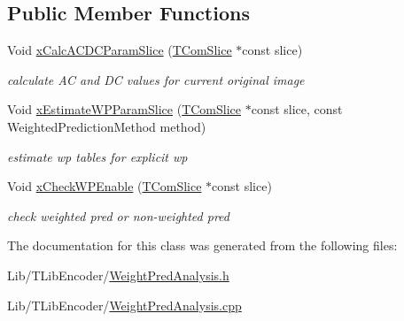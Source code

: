 \subsection*{Public Member Functions}
\begin{DoxyCompactItemize}
\item 
\mbox{\label{class_weight_pred_analysis_a6c76239d875ad77ca7385ce01493a03f}} 
Void \hyperlink{class_weight_pred_analysis_a6c76239d875ad77ca7385ce01493a03f}{x\+Calc\+A\+C\+D\+C\+Param\+Slice} (\hyperlink{class_t_com_slice}{T\+Com\+Slice} $\ast$const slice)
\begin{DoxyCompactList}\small\item\em calculate AC and DC values for current original image \end{DoxyCompactList}\item 
\mbox{\label{class_weight_pred_analysis_a34f31c250a35eb65200e8a6f50c2397b}} 
Void \hyperlink{class_weight_pred_analysis_a34f31c250a35eb65200e8a6f50c2397b}{x\+Estimate\+W\+P\+Param\+Slice} (\hyperlink{class_t_com_slice}{T\+Com\+Slice} $\ast$const slice, const Weighted\+Prediction\+Method method)
\begin{DoxyCompactList}\small\item\em estimate wp tables for explicit wp \end{DoxyCompactList}\item 
\mbox{\label{class_weight_pred_analysis_ac1dc525942f25d505ca5cd58de774a2b}} 
Void \hyperlink{class_weight_pred_analysis_ac1dc525942f25d505ca5cd58de774a2b}{x\+Check\+W\+P\+Enable} (\hyperlink{class_t_com_slice}{T\+Com\+Slice} $\ast$const slice)
\begin{DoxyCompactList}\small\item\em check weighted pred or non-\/weighted pred \end{DoxyCompactList}\end{DoxyCompactItemize}


The documentation for this class was generated from the following files\+:\begin{DoxyCompactItemize}
\item 
Lib/\+T\+Lib\+Encoder/\hyperlink{_weight_pred_analysis_8h}{Weight\+Pred\+Analysis.\+h}\item 
Lib/\+T\+Lib\+Encoder/\hyperlink{_weight_pred_analysis_8cpp}{Weight\+Pred\+Analysis.\+cpp}\end{DoxyCompactItemize}
